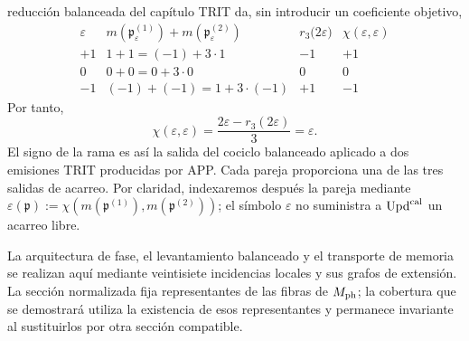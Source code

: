 reducción balanceada del capítulo TRIT da, sin introducir un coeficiente
objetivo,
\begin{equation}
 \begin{array}{c|c|c|c}
 \varepsilon&m(\mathfrak p_\varepsilon^{(1)})
                  +m(\mathfrak p_\varepsilon^{(2)})
   &r_3\bigl(2\varepsilon\bigr)&
   \chi(\varepsilon,\varepsilon)\\ \hline
 +1&1+1=(-1)+3\cdot1&-1&+1\\
 0&0+0=0+3\cdot0&0&0\\
 -1&(-1)+(-1)=1+3\cdot(-1)&+1&-1
 \end{array}
 \label{ix:eq:tres-carry-derivados-ch}
\end{equation}
Por tanto,
\begin{equation}
 \chi(\varepsilon,\varepsilon)
 =\frac{2\varepsilon-r_3(2\varepsilon)}3=\varepsilon.
 \label{ix:eq:carry-no-parametrico-ch}
\end{equation}
El signo de la rama es así la salida del cociclo balanceado aplicado a dos
emisiones TRIT producidas por APP. Cada pareja proporciona una de las tres
salidas de acarreo. Por claridad, indexaremos después la pareja mediante
\(\varepsilon(\mathfrak p):=
\chi(m(\mathfrak p^{(1)}),m(\mathfrak p^{(2)}))\); el símbolo
\(\varepsilon\) no suministra a \(\operatorname{Upd}^{\rm cal}\) un acarreo libre.

La arquitectura de fase, el levantamiento balanceado y el transporte de
memoria se realizan aquí mediante veintisiete incidencias locales y sus
grafos de extensión. La sección normalizada fija representantes de las
fibras de \(M_{\rm ph}\); la cobertura que se demostrará utiliza la existencia
de esos representantes y permanece invariante al sustituirlos por otra
sección compatible.

